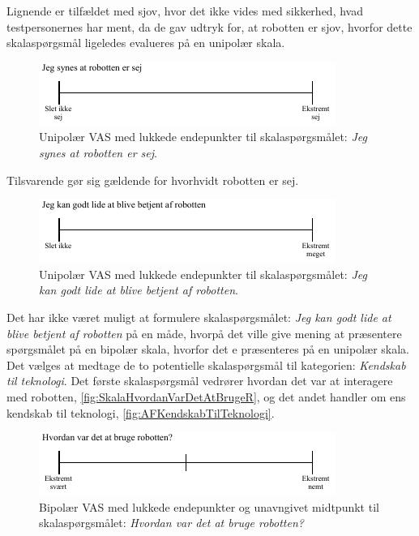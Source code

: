 \noindent
%
Lignende er tilfældet med sjov, hvor det ikke vides med sikkerhed, hvad testpersonernes har ment, da de gav udtryk for, at robotten er sjov, hvorfor dette skalaspørgsmål ligeledes evalueres på en unipolær skala. 
%
\begin{figure}[H]
\centering
\includegraphics[width =\textwidth]{Figure/UdvalgteSkalaer/SejR} 
\caption{Unipolær VAS med lukkede endepunkter til skalaspørgsmålet: \textit{Jeg synes at robotten er sej}.}
\label{fig:SkalaSejR}
\end{figure}
\noindent
%
Tilsvarende gør sig gældende for hvorhvidt robotten er sej. 
%
\begin{figure}[H]
\centering
\includegraphics[width =\textwidth]{Figure/UdvalgteSkalaer/BetjeningAfR} 
\caption{Unipolær VAS med lukkede endepunkter til skalaspørgsmålet: \textit{Jeg kan godt lide at blive betjent af robotten}.}
\label{fig:SkalaBetjeningAfR}
\end{figure}
\noindent
%
Det har ikke været muligt at formulere skalaspørgsmålet: \textit{Jeg kan godt lide at blive betjent af robotten} på en måde, hvorpå det ville give mening at præsentere spørgsmålet på en bipolær skala, hvorfor det e præsenteres på en unipolær skala.\blankline
%
Det vælges at medtage de to potentielle skalaspørgsmål til kategorien: \textit{Kendskab til teknologi}. Det første skalaspørgsmål vedrører hvordan det var at interagere med robotten, \autoref{fig:SkalaHvordanVarDetAtBrugeR}, og det andet handler om ens kendskab til teknologi, \autoref{fig:AFKendskabTilTeknologi}.
%
\begin{figure}[H]
\centering
\includegraphics[width =\textwidth]{Figure/UdvalgteSkalaer/HvordanVarDetAtBrugeR} 
\caption{Bipolær VAS med lukkede endepunkter og unavngivet midtpunkt til skalaspørgsmålet: \textit{Hvordan var det at bruge robotten?}}
\label{fig:SkalaHvordanVarDetAtBrugeR}
\end{figure}
